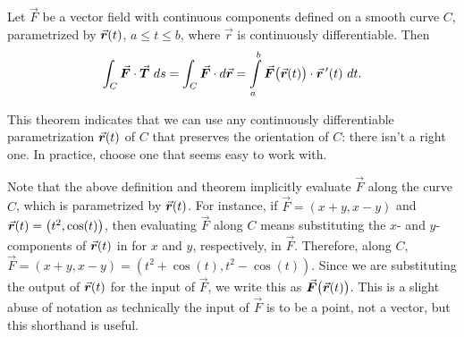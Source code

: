\begin{theorem}\label{idea:line2}
Let $\vec F$ be a vector field with continuous components defined on a smooth curve $C$, parametrized by $\vrt$, $a\leq t\leq b$, where $\vec r$ is continuously differentiable. Then
	$$\int_C\vec F\cdot\vec T\ ds = \int_C \vec F\cdot d\vec r =\int\limits_a^b \vec F\big(\vec r(t)\big) \cdot \vrp(t)\ dt.$$
\end{theorem}

This theorem indicates that we can use any continuously differentiable parametrization $\vrt$ of $C$ that preserves the orientation of $C$: there isn't a right one. In practice, choose one that seems easy to work with. 

Note that the above definition and theorem implicitly evaluate $\vec F$ along the curve $C$, which is parametrized by $\vrt$. For instance, if $\vec F = \left( x+y, x-y\right)$ and $\vrt = \left( t^2,\cos(t)\right)$, then evaluating $\vec F$ along $C$ means substituting the $x$- and $y$-components of $\vrt$ in for $x$ and $y$, respectively, in $\vec F$. Therefore, along $C$, $\vec F = \left( x+y,x-y\right) = \left( t^2+\cos(t), t^2-\cos(t)\right)$. Since we are substituting the output of $\vrt$ for the input of $\vec F$, we write this as $\vec F\big(\vrt\big)$. This is a slight abuse of notation as technically the input of $\vec F$ is to be a point, not a vector, but this shorthand is useful.


